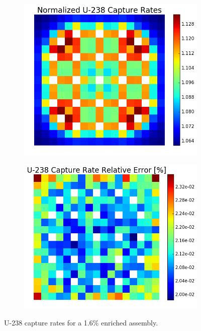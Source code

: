 \begin{figure}[h!]
\centering
\begin{subfigure}{0.44\textwidth}
  \centering
  \includegraphics[width=\linewidth]{figures/benchmarks/capture-rates/capt-mean-assm-16}
  \caption{}
  \label{fig:chap7-capt-rate-mean-1.6-assm}
\end{subfigure}%
\begin{subfigure}{0.44\textwidth}
  \centering
  \includegraphics[width=\linewidth]{figures/benchmarks/capture-rates/capt-rel-err-assm-16}
  \caption{}
  \label{fig:chap7-capt-rate-rel-err-1.6-assm}
\end{subfigure}%
\caption[U-238 capture rates for a 1.6\% enriched assembly]{U-238 capture rates for a 1.6\% enriched assembly.}
\label{fig:chap7-capt-rates-1.6-assm}
\end{figure}

